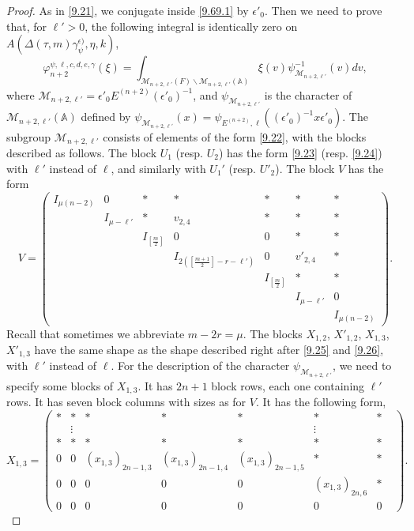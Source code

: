 \documentclass[12pts]{amsart}
\newcommand{\BA}{{\mathbb {A}}}
\begin{document}
\begin{proof}
As in \eqref{9.21}, we conjugate inside \eqref{9.69.1} by $\epsilon'_0$. Then we need to prove that, for $\ell'>0$, the following integral is identically zero on $A(\Delta(\tau,m)\gamma_\psi^{\epsilon)},\eta,k)$,
\begin{equation}\label{9.73}
\varphi_{n+2}^{\psi,\ell,c,d,e,\gamma}(\xi)=
\int_{\mathcal{M}_{n+2,\ell'}(F)\backslash
	\mathcal{M}_{n+2,\ell'}(\BA)}\xi(v)\psi^{-1}_{\mathcal{M}_{n+2,\ell'}}(v)dv, 
\end{equation}
where $\mathcal{M}_{n+2,\ell'}=\epsilon'_0E^{(n+2)}(\epsilon'_0)^{-1}$, and $\psi_{\mathcal{M}_{n+2,\ell'}}$ is the character of $\mathcal{M}_{n+2,\ell'}(\BA)$ defined by $\psi_{\mathcal{M}_{n+2,\ell'}}(x)=\psi_{E^{(n+2)},\ell}((\epsilon'_0)^{-1}x\epsilon'_0)$. The subgroup $\mathcal{M}_{n+2,\ell'}$ consists of elements of the form \eqref{9.22}, with the blocks described as follows. The block $U_1$ (resp. $U_2$) has the form \eqref{9.23} (resp. \eqref{9.24}) with $\ell'$ instead of $\ell$, and similarly with $U_1'$ (resp. $U'_2$). The block $V$ has the form
\begin{equation}\label{9.74}
V=\begin{pmatrix}I_{\mu(n-2)}&0&\ast&\ast&\ast&\ast&\ast\\&I_{\mu-\ell'}&\ast&v_{2,4}&\ast&\ast&\ast\\&&I_{[\frac{m}{2}]}&0&0&\ast&\ast\\&&&I_{2([\frac{m+1}{2}]-r-\ell')}&0&v'_{2,4}&\ast\\&&&&I_{[\frac{m}{2}]}&\ast&\ast\\&&&&&I_{\mu-\ell'}&0\\&&&&&&I_{\mu(n-2)}\end{pmatrix}.
\end{equation}
Recall that sometimes we abbreviate $m-2r=\mu$. The blocks $X_{1,2}$, $X'_{1,2}$, $X_{1,3}$, $X'_{1,3}$ have the same shape as the shape described right after \eqref{9.25} and \eqref{9.26}, with $\ell'$ instead of $\ell$. For the description of the character $\psi_{\mathcal{M}_{n+2,\ell'}}$, we need to specify some blocks of $X_{1,3}$. It has $2n+1$ block rows, each one containing $\ell'$ rows. It has seven block columns with sizes as for $V$. It has the following form,
\begin{equation}\label{9.75}
X_{1,3}=\begin{pmatrix}\ast&\ast&\ast&\ast&\ast&\ast&\ast\\&\vdots&&&&\vdots&&\\\ast&\ast&\ast&\ast&\ast&\ast&\ast\\0&0&(x_{1,3})_{2n-1,3}&(x_{1,3})_{2n-1,4}&(x_{1,3})_{2n-1,5}&\ast&\ast\\0&0&0&0&0&(x_{1,3})_{2n,6}&\ast\\0&0&0&0&0&0&0\end{pmatrix}.

\end{equation}
\end{proof}
\end{document}
